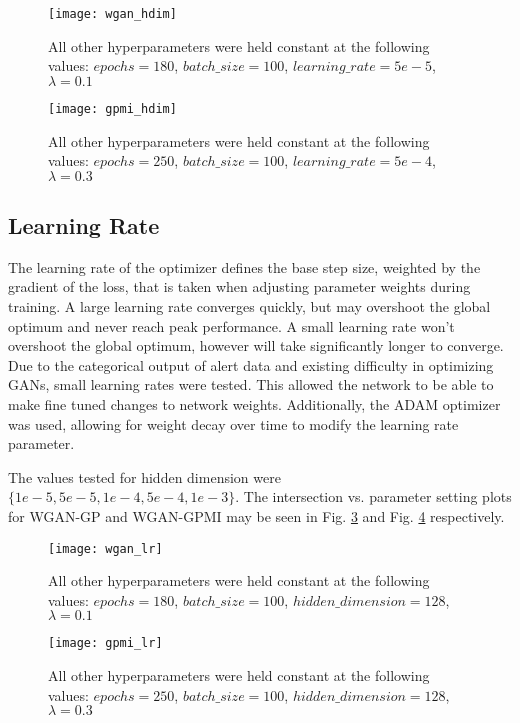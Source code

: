 \begin{figure}[!htbp]
	\centering%
	\texttt{[image: wgan\_hdim]}
	\caption{
		All other hyperparameters were held constant at the following values: $epochs=180$, $batch\_size = 100$, $learning\_rate=5e-5$, $\lambda=0.1$
	}
	\label{fig:wgan_hdim}
\end{figure}

\begin{figure}[!htbp]
	\centering%
	\texttt{[image: gpmi\_hdim]}
	\caption{
		All other hyperparameters were held constant at the following values: $epochs=250$, $batch\_size=100$, $learning\_rate=5e-4$, $\lambda=0.3$
	}
	\label{fig:gpmi_hdim}
\end{figure}


\subsection{Learning Rate}
The learning rate of the optimizer defines the base step size, weighted by the gradient of the loss, that is taken when adjusting parameter weights during training. A large learning rate converges quickly, but may overshoot the global optimum and never reach peak performance. A small learning rate won't overshoot the global optimum, however will take significantly longer to converge. Due to the categorical output of alert data and existing difficulty in optimizing GANs, small learning rates were tested. This allowed the network to be able to make fine tuned changes to network weights. Additionally, the ADAM optimizer was used, allowing for weight decay over time to modify the learning rate parameter. 


The values tested for hidden dimension were $\{1e-5, 5e-5, 1e-4, 5e-4, 1e-3\}$. The intersection vs. parameter setting plots for WGAN-GP and WGAN-GPMI may be seen in Fig. \ref{fig:wgan_lr} and Fig. \ref{fig:gpmi_lr} respectively. 

\begin{figure}[!htbp]
	\centering%
	\texttt{[image: wgan\_lr]}
	\caption{
		All other hyperparameters were held constant at the following values: $epochs=180$, $batch\_size = 100$, $hidden\_dimension=128$, $\lambda=0.1$
	}
	\label{fig:wgan_lr}
\end{figure}

\begin{figure}[!htbp]
	\centering%
	\texttt{[image: gpmi\_lr]}
	\caption{
		All other hyperparameters were held constant at the following values: $epochs=250$, $batch\_size=100$, $hidden\_dimension=128$, $\lambda=0.3$
	}
	\label{fig:gpmi_lr}
\end{figure}

